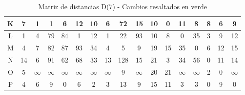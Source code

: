 \documentclass[12pt]{article}
\begin{document}
\begin{table}[h!]
\begin{tabular}{|c|c|c|c|c|c|c|c|c|c|c|c|c|c|c|c|c|}
K & \cellcolor{lightgreen} 7 & 1 & 1 & 6 & 12 & 10 & 6 & 72 & 15 & 10 & 0 & 11 & 8 & \cellcolor{lightgreen} 8 & 6 & 9 \\\hline
L & 1 & 4 & \cellcolor{lightgreen} 79 & \cellcolor{lightgreen} 84 & 1 & 12 & 1 & 22 & \cellcolor{lightgreen} 93 & 10 & 8 & 0 & 35 & \cellcolor{lightgreen} 3 & 9 & 12 \\\hline
M & 4 & 7 & \cellcolor{lightgreen} 82 & \cellcolor{lightgreen} 87 & \cellcolor{lightgreen} 93 & 34 & 4 & 5 & 9 & 19 & 15 & 35 & 0 & \cellcolor{lightgreen} 6 & 12 & 15 \\\hline
N & \cellcolor{lightgreen} 14 & 6 & \cellcolor{lightgreen} 91 & 62 & 68 & 33 & 13 & 128 & 15 & 21 & 3 & 34 & 56 & 0 & 11 & 14 \\\hline
O & 5 & $\infty$ & $\infty$ & $\infty$ & $\infty$ & $\infty$ & $\infty$ & 9 & $\infty$ & 20 & 21 & $\infty$ & $\infty$ & 2 & 0 & $\infty$ \\\hline
P & 4 & 6 & 9 & 0 & 6 & 2 & 3 & 13 & 9 & 15 & 11 & 3 & 3 & 0 & 9 & 0 \\\hline
\end{tabular}
\caption{Matriz de distancias D(7) - Cambios resaltados en verde}
\end{table}
\end{document}
